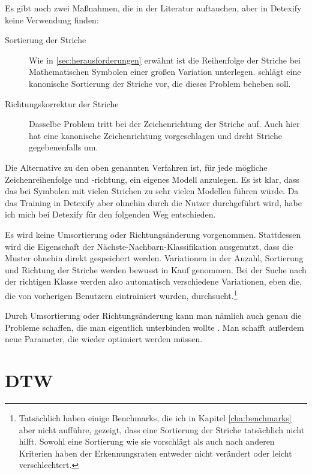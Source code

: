 Es gibt noch zwei Maßnahmen, die in der Literatur auftauchen, aber in Detexify keine Verwendung finden:

\begin{description}
  \item[Sortierung der Striche] Wie in \ref{sec:herausforderungen} erwähnt ist die Reihenfolge der Striche bei Mathematischen Symbolen einer großen Variation unterlegen. \citet{Matasakis:1999p9465} schlägt eine kanonische Sortierung der Striche vor, die dieses Problem beheben soll.
  \item[Richtungskorrektur der Striche] Dasselbe Problem tritt bei der Zeichenrichtung der Striche auf. Auch hier hat \citet{Matasakis:1999p9465} eine kanonische Zeichenrichtung vorgeschlagen und dreht Striche gegebenenfalls um.
\end{description}

Die Alternative zu den oben genannten Verfahren ist, für jede mögliche Zeichenreihenfolge und -richtung, ein eigenes Modell anzulegen. Es ist klar, dass das bei Symbolen mit vielen Strichen zu sehr vielen Modellen führen würde. Da das Training in Detexify aber ohnehin durch die Nutzer durchgeführt wird, habe ich mich bei Detexify für den folgenden Weg entschieden.

Es wird keine Umsortierung oder Richtungsänderung vorgenommen. Stattdessen wird die Eigenschaft der Nächste-Nachbarn-Klassifikation ausgenutzt, dass die Muster ohnehin direkt gespeichert werden. Variationen in der Anzahl, Sortierung und Richtung der Striche werden bewusst in Kauf genommen. Bei der Suche nach der richtigen Klasse werden also automatisch verschiedene Variationen, eben die, die von vorherigen Benutzern eintrainiert wurden, durchsucht.\footnote{Tatsächlich haben einige Benchmarks, die ich in Kapitel \ref{cha:benchmarks} aber nicht aufführe, gezeigt, dass eine Sortierung der Striche tatsächlich nicht hilft. Sowohl eine Sortierung wie \citet{Matasakis:1999p9465} sie vorschlägt als auch nach anderen Kriterien haben der Erkennungsraten entweder nicht verändert oder leicht verschlechtert.}

Durch Umsortierung oder Richtungsänderung kann man nämlich auch genau die Probleme schaffen, die man eigentlich unterbinden wollte \cite{Matasakis:1999p9465}. Man schafft außerdem neue Parameter, die wieder optimiert werden müssen.

\section{DTW} %
\label{sec:dtw}

